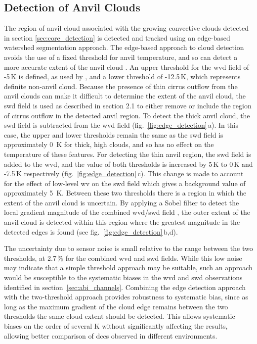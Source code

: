 \subsection{Detection of Anvil Clouds} \label{sec:anvil_detection}

The region of anvil cloud associated with the growing convective clouds detected in section \ref{sec:core_detection} is detected and tracked using an edge-based watershed segmentation approach.
The edge-based approach to cloud detection avoids the use of a fixed threshold for anvil temperature, and so can detect a more accurate extent of the anvil cloud \citep{dim_alternative_2013}.
An upper threshold for the \acrshort{wvd} field of -5\,\unit{K} is defined, as used by \citet{muller_role_2018}, and a lower threshold of -12.5\,\unit{K}, which represents definite non-anvil cloud.
Because the presence of thin cirrus outflow from the anvil clouds can make it difficult to determine the extent of the anvil cloud, the \acrshort{swd} field is used as described in section 2.1 to either remove or include the region of cirrus outflow in the detected anvil region.
To detect the thick anvil cloud, the \acrshort{swd} field is subtracted from the \acrshort{wvd} field (fig.~\ref{fig:edge_detection}\,a).
In this case, the upper and lower thresholds remain the same as the \acrshort{swd} field is approximately 0~K for thick, high clouds, and so has no effect on the temperature of these features.
For detecting the thin anvil region, the \acrshort{swd} field is added to the \acrfull{wvd}, and the value of both thresholds is increased by 5\,\unit{K} to 0\,\unit{K} and -7.5\,\unit{K} respectively (fig.~\ref{fig:edge_detection}\,c).
This change is made to account for the effect of low-level \acrshort{wv} on the \acrshort{swd} field which gives a background value of approximately 5~K.
Between these two thresholds there is a region in which the extent of the anvil cloud is uncertain.
By applying a Sobel filter to detect the local gradient magnitude of the combined \acrshort{wvd}/\acrshort{swd} field \citep{sobel_isotropic_2014}, the outer extent of the anvil cloud is detected within this region where the greatest magnitude in the detected edges is found (see fig.~\ref{fig:edge_detection}\,b,d).

The uncertainty due to sensor noise is small relative to the range between the two thresholds, at 2.7\,\% for the combined \acrshort{wvd} and \acrshort{swd} fields.
While this low noise may indicate that a simple threshold approach may be suitable, such an approach would be susceptible to the systematic biases in the \acrshort{wvd} and \acrshort{swd} observations identified in section~\ref{sec:abi_channels}.
Combining the edge detection approach with the two-threshold approach provides robustness to systematic bias, since as long as the maximum gradient of the cloud edge remains between the two thresholds the same cloud extent should be detected.
This allows systematic biases on the order of several K without significantly affecting the results, allowing better comparison of \acrshort{dcc}s observed in different environments.


